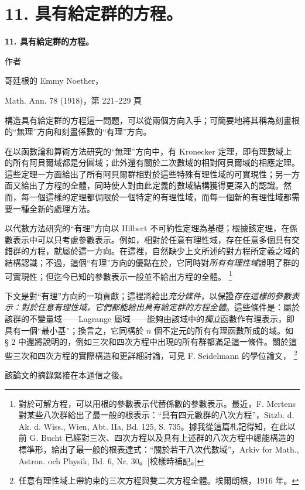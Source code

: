 \documentclass[11pt]{article}
\providecommand{\glqq}{“}
\providecommand{\grqq}{”}
\providecommand{\srcfn}[2]{%
  \begingroup
  \renewcommand{\thefootnote}{#1}%
  \footnote{#2}%
  \addtocounter{footnote}{-1}%
  \endgroup}
\begin{document}
\setcounter{footnote}{0}
\section*{11. 具有給定群的方程。}
\begin{center}
{\Large\bfseries 11. 具有給定群的方程。}\par
\vspace{0.75em}
作者\par
\vspace{0.75em}
哥廷根的 Emmy Noether，\par
\vspace{1.5em}
Math. Ann. 78 (1918)，第 221--229 頁
\end{center}

\vspace{4em}

構造具有給定群的方程這一問題，可以從兩個方向入手；可簡要地將其稱為刻畫根的\glqq{}無理\grqq{}方向和刻畫係數的\glqq{}有理\grqq{}方向。

在以函數論和算術方法研究的\glqq{}無理\grqq{}方向中，有 Kronecker 定理，即有理數域上的所有阿貝爾域都是分圓域；此外還有關於二次數域的相對阿貝爾域的相應定理。這些定理一方面給出了所有阿貝爾群相對於這些特殊有理性域的可實現性；另一方面又給出了方程的全體，同時使人對由此定義的數域結構獲得更深入的認識。然而，每一個這樣的定理都侷限於一個特定的有理性域，而每一個新的有理性域都需要一種全新的處理方法。

以代數方法研究的\glqq{}有理\grqq{}方向以 Hilbert 不可約性定理為基礎；根據該定理，在係數表示中可以只考慮參數表示。例如，相對於任意有理性域，存在任意多個具有交錯群的方程，就屬於這一方向。在這裡，自然缺少上文所述的對方程所定義之域的結構認識；不過，這個\glqq{}有理\grqq{}方向的優點在於，它同時對\emph{所有有理性域}證明了群的可實現性；但迄今已知的參數表示一般並不給出方程的全體。\srcfn{*)}{對於可解方程，可以用根的參數表示代替係數的參數表示。最近，F. Mertens 對某些八次群給出了最一般的根表示：\glqq{}具有四元數群的八次方程\grqq{}，Sitzb. d. Ak. d. Wiss., Wien, Abt. IIa, Bd. 125, S. 735。據我從這篇札記得知，在此以前 G. Bucht 已經對三次、四次方程以及具有上述群的八次方程中總能構造的標準形，給出了最一般的根表達式：\glqq{}關於若干八次代數域\grqq{}，Arkiv for Math., Astron. och Physik, Bd. 6, Nr. 30。[校樣時補記。]} 

下文是對\glqq{}有理\grqq{}方向的一項貢獻；這裡將給出\emph{充分條件}，以保證\emph{存在這樣的參數表示：對於任意有理性域，它們都能給出具有給定群的方程全體}。這些條件是：屬於該群的不變量域——Lagrange 屬域——能夠由該域中的\emph{獨立}函數作有理表示，即具有一個\glqq{}最小基\grqq{}；換言之，它同構於 $n$ 個不定元的所有有理函數所成的域。如 § 2 中還將說明的，例如三次和四次方程中出現的所有群都滿足這一條件。關於這些三次和四次方程的實際構造和更詳細討論，可見 F. Seidelmann 的學位論文，\srcfn{*)}{任意有理性域上帶約束的三次方程與雙二次方程全體。埃爾朗根，1916 年。}該論文的摘錄緊接在本通信之後。
\end{document}
